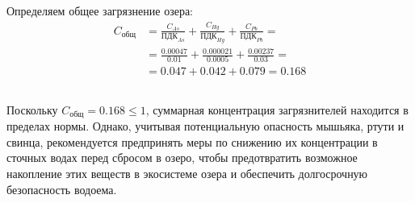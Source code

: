 \subsection*{  }
Определяем общее загрязнение озера:
\begin{align*}
    C_\text{общ} &=
    \frac{C_{As}}{\text{ПДК}_{As}} + \frac{C_{Hg}}{\text{ПДК}_{Hg}} + \frac{C_{Pb}}{\text{ПДК}_{Pb}} = \\
    &= \frac{0.00047}{0.01} + \frac{0.000021}{0.0005} + \frac{0.00237}{0.03} = \\
    &= 0.047 + 0.042 + 0.079 = 0.168
\end{align*}


\subsection*{  }
Поскольку $C_\text{общ} = 0.168 \le 1$, суммарная концентрация загрязнителей находится в пределах нормы. Однако, учитывая потенциальную опасность мышьяка, ртути и свинца, рекомендуется предпринять меры по снижению их концентрации в сточных водах перед сбросом в озеро, чтобы предотвратить возможное накопление этих веществ в экосистеме озера и обеспечить долгосрочную безопасность водоема.
